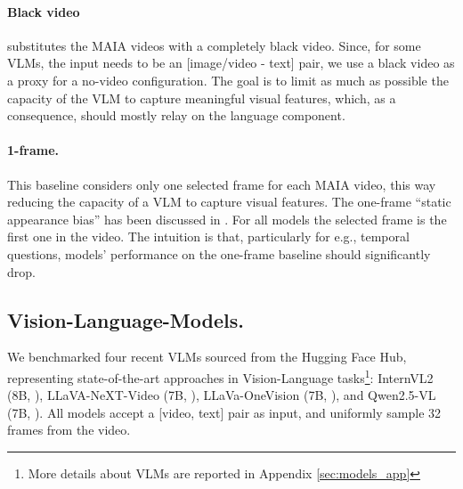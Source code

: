 \paragraph{Black video} substitutes the MAIA videos with a completely black video. Since, for some VLMs, the input needs to be an [image/video - text] pair, we use a black video as a proxy for a no-video configuration. The goal is to limit as much as possible the capacity of the VLM to capture meaningful visual features, which, as a consequence, should mostly relay on the language component. 

\paragraph{1-frame.} This baseline considers only one selected frame for each MAIA video, this way  reducing the capacity of a VLM to capture visual features. The one-frame “static appearance bias”  has been discussed in  \cite{lei-etal-2023-revealing}.  For all models the selected frame is the first one in the video. 
The intuition is that, particularly for e.g.,  temporal  questions, models' performance on the one-frame baseline should significantly drop.


\subsection{Vision-Language-Models.}
We benchmarked four recent VLMs sourced from the Hugging Face Hub, representing state-of-the-art approaches in Vision-Language tasks\footnote{More details about VLMs are reported in Appendix \ref{sec:models_app} }: InternVL2 (8B, \citet{internvl}), LLaVA-NeXT-Video (7B, \citet{llavanextvideo}), LLaVa-OneVision (7B, \citet{llavaonevisioneasyvisualtask}), and Qwen2.5-VL (7B, \citet{qwen2.5technicalreport}). All models accept a [video, text] pair as input, and uniformly sample 32 frames from the video.




\label{ref:results}








